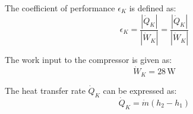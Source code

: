 The coefficient of performance \( \epsilon_K \) is defined as:  
\[
\epsilon_K = \frac{|\dot{Q}_K|}{|\dot{W}_K|} = \frac{|\dot{Q}_K|}{|\dot{W}_K|}
\]  

The work input to the compressor is given as:  
\[
\dot{W}_K = 28 \, \text{W}
\]  

The heat transfer rate \( \dot{Q}_K \) can be expressed as:  
\[
\dot{Q}_K = \dot{m} (h_2 - h_1)
\]